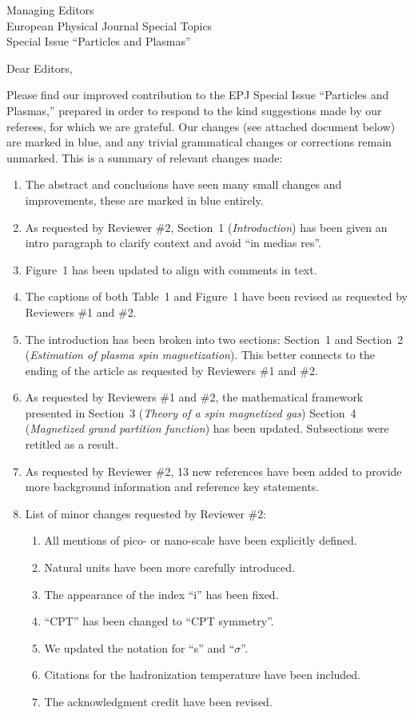 \documentclass{letter}
\date{March 24, 2025}
\begin{document}
\begin{letter}{Managing Editors\\European Physical Journal Special Topics\\Special Issue ``Particles and Plasmas''}
\opening{Dear Editors,}
 
Please find our improved contribution to the EPJ Special Issue ``Particles and Plasmas,'' prepared in order to respond to the kind suggestions made by our referees, for which we are grateful. Our changes (see attached document below) are marked in blue, and any trivial grammatical changes or corrections remain unmarked. This is a summary of relevant changes made:

\begin{enumerate}
    \item The abstract and conclusions have seen many small changes and improvements, these are marked in blue entirely.
    \item As requested by Reviewer \#2, Section~1 (\textit{Introduction}) has been given an intro paragraph  to clarify context and avoid ``in medias res''.  
    \item Figure~1 has been updated to align with comments in text.
    \item The captions of both Table~1 and Figure~1 have been revised as requested by Reviewers \#1 and \#2.
    \item The introduction has been broken into two sections: Section~1 and Section~2 (\textit{Estimation of plasma spin magnetization}). This better connects to the ending of the article as requested by Reviewers \#1 and \#2.
    \item As requested by Reviewers \#1 and \#2, the mathematical framework presented in Section~3 (\textit{Theory of a spin magnetized gas}) Section~4 (\textit{Magnetized grand partition function}) has been updated. Subsections were retitled as a result. 
    \item As requested by Reviewer \#2, 13 new references have been added to provide more background information and reference key statements.
    \item List of minor changes requested by Reviewer \#2:
    \begin{enumerate}
        \item All mentions of pico- or nano-scale have been explicitly defined.
        \item Natural units have been more carefully introduced.
        \item The appearance of the index ``i'' has been fixed.
        \item ``CPT'' has been changed to ``CPT symmetry''.
        \item We updated the notation for ``s'' and ``$\sigma$''.
        \item Citations for the hadronization temperature have been included.
        \item The acknowledgment credit have been revised.
    \end{enumerate}
\end{enumerate}


\end{letter}
\end{document}
